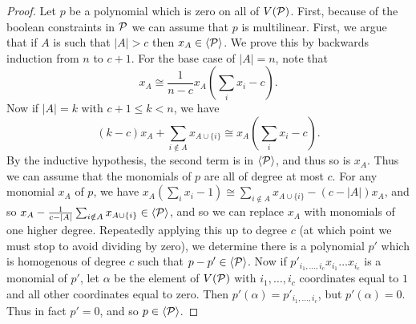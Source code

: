 \begin{proof}
Let $p$ be a polynomial which is zero on all of $V(\mathcal P)$. First, because of the boolean constraints in $\mathcal P$ we can assume that $p$ is multilinear. First, we argue that if $A$ is such that $|A| > c$ then $x_A \in \langle \mathcal P \rangle$. We prove this by backwards induction from $n$ to $c+1$. For the base case of $|A| = n$, note that 
\[x_A \cong \frac{1}{n-c} x_A(\sum_i x_i - c).\]
Now if $|A| = k$ with $c+1 \leq k < n$, we have
\[\left(k-c\right)x_A + \sum_{i \notin A} x_{A \cup \{i\}} \cong x_A(\sum_i x_i - c).\]
By the inductive hypothesis, the second term is in $\langle \mathcal P \rangle$, and thus so is $x_A$. Thus we can assume that the monomials of $p$ are all of degree at most $c$. For any monomial $x_A$ of $p$, we have $x_A(\sum_i x_i - 1) \cong \sum_{i \notin A} x_{A \cup \{i\}} - (c-|A|)x_A$, and so $x_A - \frac{1}{c - |A|}\sum_{i \notin A} x_{A \cup \{i\}} \in \langle \mathcal P \rangle$, and so we can replace $x_A$ with monomials of one higher degree. Repeatedly applying this up to degree $c$ (at which point we must stop to avoid dividing by zero), we determine there is a polynomial $p'$ which is homogenous of degree $c$ such that $p - p' \in \langle \mathcal P \rangle$. Now if $p'_{i_1,\dots,i_c}x_{i_1}\dots x_{i_c}$ is a monomial of $p'$, let $\alpha$ be the element of $V(\mathcal P)$ with $i_1,\dots,i_c$ coordinates equal to $1$ and all other coordinates equal to zero. Then $p'(\alpha) = p'_{i_1,\dots,i_c}$, but $p'(\alpha) = 0$. Thus in fact $p' = 0$, and so $p \in \langle \mathcal P \rangle$.
\end{proof}

